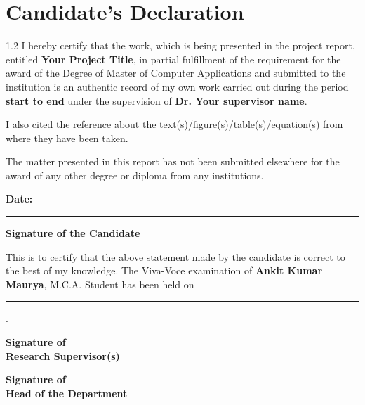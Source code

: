 \documentclass[12pt,a4paper]{report}
\begin{document}
\chapter*{Candidate's Declaration}
\begin{spacing}{1.2}
I hereby certify that the work, which is being presented in the project report, entitled \textbf{Your Project Title}, in partial fulfillment of the requirement for the award of the Degree of Master of Computer Applications and submitted to the institution is an authentic record of my own work carried out during the period \textbf{start  to end} under the supervision of \textbf{Dr. Your supervisor name}.

I also cited the reference about the text(s)/figure(s)/table(s)/equation(s) from where they have been taken.
\newline

The matter presented in this report has not been submitted elsewhere for the award of any other degree or diploma from any institutions.
\newline
\newline
\newline

\textbf{Date:} \rule{3cm}{.15mm} \hspace{5cm} \textbf{Signature of the Candidate}

\vspace{2cm}

This is to certify that the above statement made by the candidate is correct to the best of my knowledge. The Viva-Voce examination of \textbf{Ankit Kumar Maurya}, M.C.A. Student has been held on \rule{5cm}{.15mm}.

\vspace{3cm}

\begin{minipage}[t]{0.3\textwidth}
\begin{center}
    

    \textbf{Signature of \\Research Supervisor(s)} \\
    
    \end{center}
\end{minipage}%
\hfill
\begin{minipage}[t]{0.4\textwidth}
\begin{center}
    

    \textbf{Signature of \\ Head of the Department} \\
   
    \end{center}
\end{minipage}
\end{spacing}
\clearpage
\end{document}
